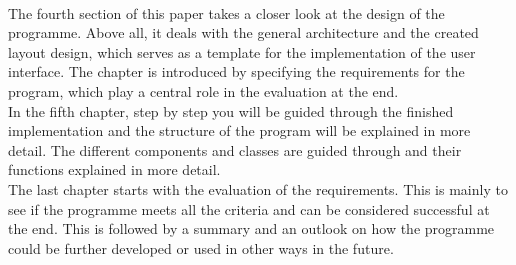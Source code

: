\\
The fourth section of this paper takes a closer look at the design of the programme. Above all, it deals with the general architecture and the created layout design, which serves as a template for the implementation of the user interface. The chapter is introduced by specifying the requirements for the program, which play a central role in the evaluation at the end.
\\
In the fifth chapter, step by step you will be guided through the finished implementation and the structure of the program will be explained in more detail. The different components and classes are guided through and their functions explained in more detail.
\\
The last chapter starts with the evaluation of the requirements. This is mainly to see if the programme meets all the criteria and can be considered successful at the end. This is followed by a summary and an outlook on how the programme could be further developed or used in other ways in the future.
